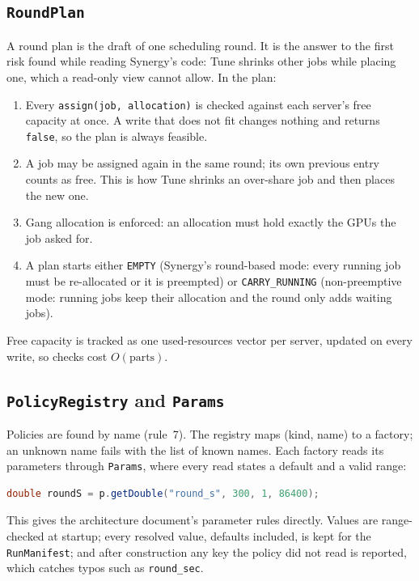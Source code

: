 \documentclass[11pt,a4paper]{article}
\newcommand{\code}[1]{\texttt{#1}}
\begin{document}
\subsection{\code{RoundPlan}}
A round plan is the draft of one scheduling round. It is the answer to the first risk found while
reading Synergy's code: Tune shrinks other jobs while placing one, which a read-only view cannot
allow. In the plan:

\begin{enumerate}
  \item Every \code{assign(job, allocation)} is checked against each server's free capacity
        at once. A write that does not fit changes nothing and returns \code{false}, so the plan
        is always feasible.
  \item A job may be assigned again in the same round; its own previous entry counts as free.
        This is how Tune shrinks an over-share job and then places the new one.
  \item Gang allocation is enforced: an allocation must hold exactly the GPUs the job asked for.
  \item A plan starts either \code{EMPTY} (Synergy's round-based mode: every running job must be
        re-allocated or it is preempted) or \code{CARRY\_RUNNING} (non-preemptive mode: running
        jobs keep their allocation and the round only adds waiting jobs).
\end{enumerate}

Free capacity is tracked as one used-resources vector per server, updated on every write, so
checks cost $O(\text{parts})$.

\subsection{\code{PolicyRegistry} and \code{Params}}
Policies are found by name (rule~7). The registry maps (kind, name) to a factory; an unknown name
fails with the list of known names. Each factory reads its parameters through \code{Params},
where every read states a default and a valid range:

\begin{lstlisting}[language=Java]
double roundS = p.getDouble("round_s", 300, 1, 86400);
\end{lstlisting}

This gives the architecture document's parameter rules directly. Values are range-checked at
startup; every resolved value, defaults included, is kept for the \code{RunManifest}; and after
construction any key the policy did not read is reported, which catches typos such as
\code{round\_sec}.
\end{document}
